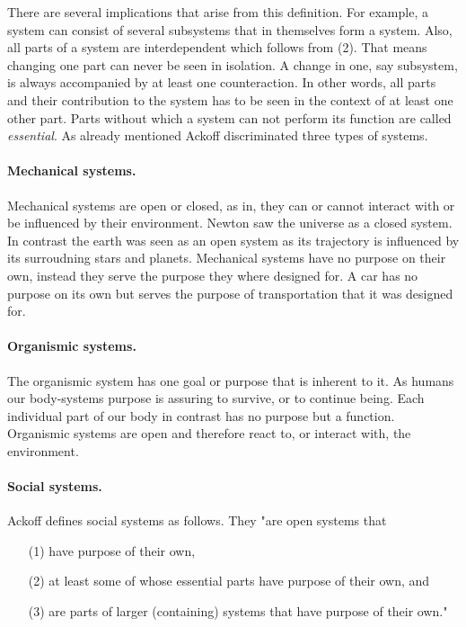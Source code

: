 \documentclass[a4paper,11pt]{article}
\begin{document}
There are several implications that arise from this definition. For example, a
system can consist of several subsystems that in themselves form a system.
Also, all parts of a system are interdependent which follows from (2). That
means changing one part can never be seen in isolation. A change in one, say
subsystem, is always accompanied by at least one counteraction. In other
words, all parts and their contribution to the system has to be seen in the
context of at least one other part.  Parts without which a system can not
perform its function are called \emph{essential}.  As already mentioned Ackoff
discriminated three types of systems.

\paragraph{Mechanical systems.}
Mechanical systems are open or closed, as in, they can or cannot interact with
or be influenced by their environment. Newton saw the universe as a closed
system. In contrast the earth was seen as an open system as its trajectory is
influenced by its surroudning stars and planets. Mechanical systems have no
purpose on their own, instead they serve the purpose they where designed for.
A car has no purpose on its own but serves the purpose of transportation that
it was designed for.

\paragraph{Organismic systems.}
The organismic system has one goal or purpose that is inherent to it. As
humans our body-systems purpose is assuring to survive, or to continue being.
Each individual part of our body in contrast has no purpose but a function.
Organismic systems are open and therefore react to, or interact with, the
environment.

\paragraph{Social systems.}
Ackoff \cite{ackoff1994systems} defines social systems as follows. They "are
open systems that
\begin{itemize}[noitemsep]
\item[(1)] have purpose of their own, 
\item[(2)] at least some of whose essential parts have purpose of their own,
  and 
\item[(3)] are parts of larger (containing) systems that have purpose of their
  own."
\end{itemize}
\end{document}
